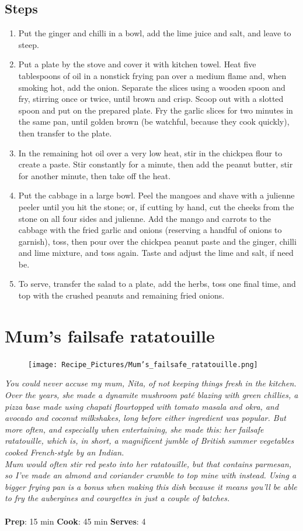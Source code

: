 \documentclass{book}
\begin{document}
\subsection*{Steps}
\begin{enumerate}
\item Put the ginger and chilli in a bowl, add the lime juice and salt, and leave to steep.
\item Put a plate by the stove and cover it with kitchen towel. Heat five tablespoons of oil in a nonstick frying pan over a medium flame and, when smoking hot, add the onion. Separate the slices using a wooden spoon and fry, stirring once or twice, until brown and crisp. Scoop out with a slotted spoon and put on the prepared plate. Fry the garlic slices for two minutes in the same pan, until golden brown (be watchful, because they cook quickly), then transfer to the plate.
\item In the remaining hot oil over a very low heat, stir in the chickpea flour to create a paste. Stir constantly for a minute, then add the peanut butter, stir for another minute, then take off the heat.
\item Put the cabbage in a large bowl. Peel the mangoes and shave with a julienne peeler until you hit the stone; or, if cutting by hand, cut the cheeks from the stone on all four sides and julienne. Add the mango and carrots to the cabbage with the fried garlic and onions (reserving a handful of onions to garnish), toss, then pour over the chickpea peanut paste and the ginger, chilli and lime mixture, and toss again. Taste and adjust the lime and salt, if need be.
\item To serve, transfer the salad to a plate, add the herbs, toss one final time, and top with the crushed peanuts and remaining fried onions.
\end{enumerate}
\newpage

\section{Mum’s failsafe ratatouille}
\begin{figure}
\centering\texttt{[image: Recipe\_Pictures/Mum’s\_failsafe\_ratatouille.png]}
\end{figure}
\emph{You could never accuse my mum, Nita, of not keeping things fresh in the kitchen. Over the years, she made a dynamite mushroom paté blazing with green chillies, a pizza base made using chapati flourtopped with tomato masala and okra, and avocado and coconut milkshakes, long before either ingredient was popular. But more often, and especially when entertaining, she made this: her failsafe ratatouille, which is, in short, a magnificent jumble of British summer vegetables cooked French-style by an Indian.\\ 
Mum would often stir red pesto into her ratatouille, but that contains parmesan, so I’ve made an almond and coriander crumble to top mine with instead. Using a bigger frying pan is a bonus when making this dish because it means you’ll be able to fry the aubergines and courgettes in just a couple of batches.}\\\\ 
\textbf{Prep}: 15 min
\textbf{Cook}: 45 min
\textbf{Serves}: 4
\end{document}
